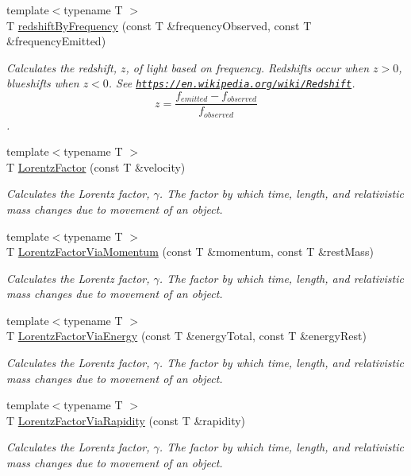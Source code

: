 \begin{DoxyCompactItemize}
{\footnotesize template$<$typename T $>$ }\\T \hyperlink{group___optics_gacc6d3b2922061214d64b89a4b8e3967a}{redshift\+By\+Frequency} (const T \&frequency\+Observed, const T \&frequency\+Emitted)
\begin{DoxyCompactList}\small\item\em Calculates the redshift, $z$, of light based on frequency. Redshifts occur when $z > 0$, blueshifts when $z < 0$. See \href{https://en.wikipedia.org/wiki/Redshift}{\tt https\+://en.\+wikipedia.\+org/wiki/\+Redshift}. \[z=\frac{f_{emitted}-f_{observed}}{f_{observed}}\]. \end{DoxyCompactList}\item 
{\footnotesize template$<$typename T $>$ }\\T \hyperlink{group___relativity_ga5f9b11c1f4c3ae26a7e64f02c22d5a75}{Lorentz\+Factor} (const T \&velocity)
\begin{DoxyCompactList}\small\item\em Calculates the Lorentz factor, $\gamma$. The factor by which time, length, and relativistic mass changes due to movement of an object. \end{DoxyCompactList}\item 
{\footnotesize template$<$typename T $>$ }\\T \hyperlink{group___relativity_ga1ea24128654ac333dd843afdd5c003b7}{Lorentz\+Factor\+Via\+Momentum} (const T \&momentum, const T \&rest\+Mass)
\begin{DoxyCompactList}\small\item\em Calculates the Lorentz factor, $\gamma$. The factor by which time, length, and relativistic mass changes due to movement of an object. \end{DoxyCompactList}\item 
{\footnotesize template$<$typename T $>$ }\\T \hyperlink{group___relativity_ga601de8c039be89a9abea22bc459436c9}{Lorentz\+Factor\+Via\+Energy} (const T \&energy\+Total, const T \&energy\+Rest)
\begin{DoxyCompactList}\small\item\em Calculates the Lorentz factor, $\gamma$. The factor by which time, length, and relativistic mass changes due to movement of an object. \end{DoxyCompactList}\item 
{\footnotesize template$<$typename T $>$ }\\T \hyperlink{group___relativity_ga8064f5bce1d2ca5f7bc39d95ba4d2dd9}{Lorentz\+Factor\+Via\+Rapidity} (const T \&rapidity)
\begin{DoxyCompactList}\small\item\em Calculates the Lorentz factor, $\gamma$. The factor by which time, length, and relativistic mass changes due to movement of an object. \end{DoxyCompactList}\end{DoxyCompactItemize}
